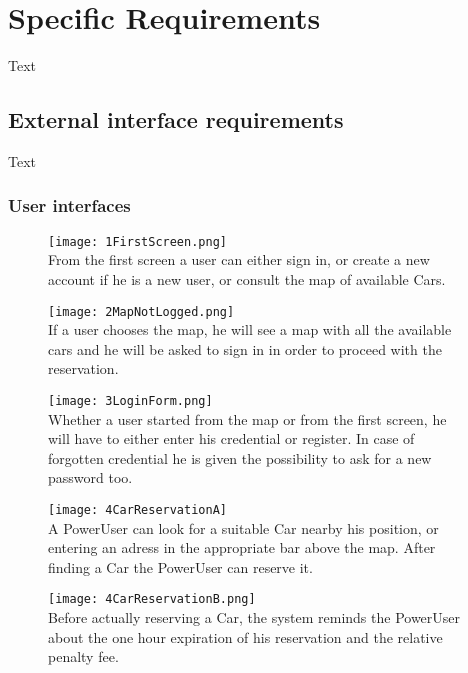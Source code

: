 \section{Specific Requirements}
Text
\subsection{External interface requirements}
Text
\subsubsection{User interfaces}

\begin{figure}[h!]
    \centering
    \texttt{[image: 1FirstScreen.png]}
    \label{fig:1FirstScreen}
    \\From the first screen a user can either sign in, or create a new account if he is a new user, or consult the map of available Cars.
\end{figure}

\begin{figure}[h!]
    \centering
    \texttt{[image: 2MapNotLogged.png]}
    \label{fig:2MapNotLogged}
    \\If a user chooses the map, he will see a map with all the available cars and he will be asked to sign in in order to proceed with the reservation.
\end{figure}

\begin{figure}[p!]
    \centering
    \texttt{[image: 3LoginForm.png]}
    \label{fig:3LoginForm}
    \\Whether a user started from the map or from the first screen, he will have to either enter his credential or register. In case of forgotten credential he is given the possibility to ask for a new password too.
\end{figure}

\begin{figure}[p!]
    \centering
    \texttt{[image: 4CarReservationA]}
    \label{fig:4CarReservationA}
    \\A PowerUser can look for a suitable Car nearby his position, or entering an adress in the appropriate bar above the map. After finding a Car the PowerUser can reserve it.
\end{figure}

\begin{figure}[p!]
    \centering
    \texttt{[image: 4CarReservationB.png]}
    \label{fig:4CarReservationB}
    \\Before actually reserving a Car, the system reminds the PowerUser about the one hour expiration of his reservation and the relative penalty fee.
\end{figure}

